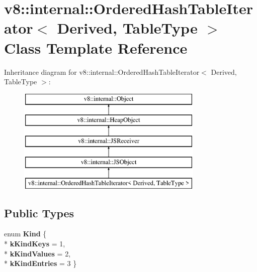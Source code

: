 \hypertarget{classv8_1_1internal_1_1_ordered_hash_table_iterator}{}\section{v8\+:\+:internal\+:\+:Ordered\+Hash\+Table\+Iterator$<$ Derived, Table\+Type $>$ Class Template Reference}
\label{classv8_1_1internal_1_1_ordered_hash_table_iterator}
Inheritance diagram for v8\+:\+:internal\+:\+:Ordered\+Hash\+Table\+Iterator$<$ Derived, Table\+Type $>$\+:\begin{figure}[H]
\begin{center}
\leavevmode
\includegraphics[height=5.000000cm]{classv8_1_1internal_1_1_ordered_hash_table_iterator}
\end{center}
\end{figure}
\subsection*{Public Types}
\begin{DoxyCompactItemize}
\item 
enum {\bfseries Kind} \{ \\*
{\bfseries k\+Kind\+Keys} = 1, 
\\*
{\bfseries k\+Kind\+Values} = 2, 
\\*
{\bfseries k\+Kind\+Entries} = 3
 \}\hypertarget{classv8_1_1internal_1_1_ordered_hash_table_iterator_a680eb92393cdb4b0e08ff952fdfdc653}{}\label{classv8_1_1internal_1_1_ordered_hash_table_iterator_a680eb92393cdb4b0e08ff952fdfdc653}

\end{DoxyCompactItemize}
